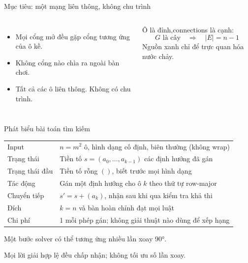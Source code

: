 
\begin{frame}{Mục tiêu: một mạng liên thông, không chu trình}
\begin{columns}[c,onlytextwidth]
\centering
{}
\begin{itemize}
\item Mọi cổng mở đều gặp cổng tương ứng của ô kề.
\item Không cổng nào chìa ra ngoài bàn chơi.
\item Tất cả các ô liên thông. Không có chu trình.
\end{itemize}
\vspace{4mm}
Ô là đỉnh,connections là cạnh:
\[
G\text{ là cây} \quad\Longrightarrow\quad |E|=n-1
\]
\small Nguồn xanh chỉ để trực quan hóa nước chảy.
\end{columns}
\end{frame}

\begin{frame}{Phát biểu bài toán tìm kiếm}
\small
\begin{tabular}{@{}p{}p{}@{}}
\toprule
Input & $n=m^2$ ô, hình dạng cố định, biên thường (không wrap) \\
Trạng thái & Tiền tố $s=(a_0,\ldots,a_{k-1})$ các định hướng đã gán \\
Trạng thái đầu & Tiền tố rỗng $()$, biết trước mọi hình dạng \\
Tác động & Gán một định hướng cho ô $k$ theo thứ tự row-major \\
Chuyển tiếp & $s'=s+(a_k)$, nhận sau khi qua kiểm tra khả thi \\
Đích & $k=n$ và bàn hoàn chỉnh đạt mọi luật \\
Chi phí & 1 mỗi phép gán; không giải thuật nào dùng để xếp hạng \\
\bottomrule
\end{tabular}\par
\vspace{5mm}
\normalsize Một bước solver có thể tương ứng nhiều lần xoay 90°.\par
\small Mọi lời giải hợp lệ đều chấp nhận; không tối ưu số lần xoay.
\end{frame}

